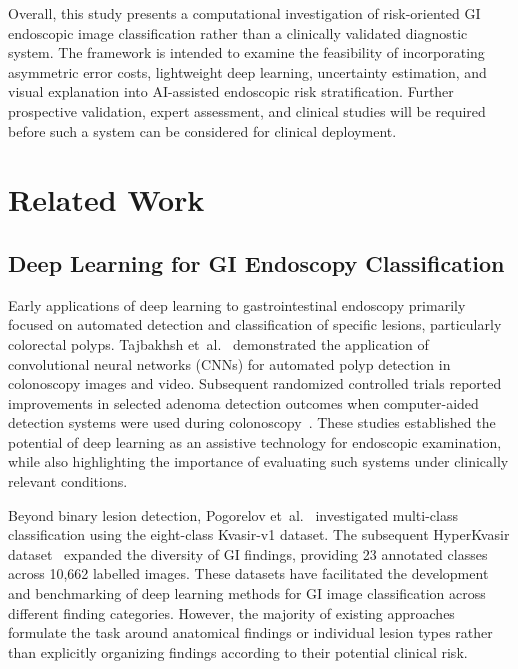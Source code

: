 \documentclass[11pt,a4paper]{article}
\begin{document}
Overall, this study presents a computational investigation of risk-oriented GI endoscopic image classification rather than a clinically validated diagnostic system. The framework is intended to examine the feasibility of incorporating asymmetric error costs, lightweight deep learning, uncertainty estimation, and visual explanation into AI-assisted endoscopic risk stratification. Further prospective validation, expert assessment, and clinical studies will be required before such a system can be considered for clinical deployment.

\section{Related Work}
\label{sec:relwork}

\subsection{Deep Learning for GI Endoscopy Classification}
Early applications of deep learning to gastrointestinal endoscopy primarily
focused on automated detection and classification of specific lesions,
particularly colorectal polyps. Tajbakhsh et~al.~\citep{Tajbakhsh2016}
demonstrated the application of convolutional neural networks (CNNs) for
automated polyp detection in colonoscopy images and video. Subsequent
randomized controlled trials reported improvements in selected adenoma
detection outcomes when computer-aided detection systems were used during
colonoscopy~\citep{Wang2019}. These studies established the potential of deep
learning as an assistive technology for endoscopic examination, while also
highlighting the importance of evaluating such systems under clinically
relevant conditions.

Beyond binary lesion detection, Pogorelov et~al.~\citep{Pogorelov2017}
investigated multi-class classification using the eight-class Kvasir-v1
dataset. The subsequent HyperKvasir dataset~\citep{Borgli2020} expanded the
diversity of GI findings, providing 23 annotated classes across 10,662
labelled images. These datasets have facilitated the development and
benchmarking of deep learning methods for GI image classification across
different finding categories. However, the majority of existing approaches
formulate the task around anatomical findings or individual lesion types
rather than explicitly organizing findings according to their potential
clinical risk.
\end{document}
